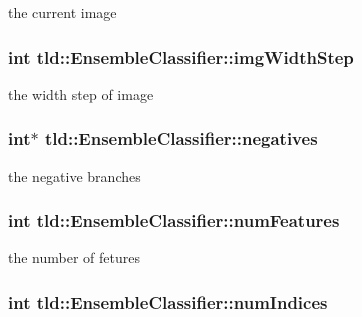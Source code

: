 the current image 

\hypertarget{classtld_1_1EnsembleClassifier_a149e36a3d0d287ee804ec7cf92dc6569}{
\subsubsection[{img\-Width\-Step}]{\setlength{\rightskip}{0pt plus 5cm}int tld\-::\-Ensemble\-Classifier\-::img\-Width\-Step}}\label{classtld_1_1EnsembleClassifier_a149e36a3d0d287ee804ec7cf92dc6569}


the width step of image 

\hypertarget{classtld_1_1EnsembleClassifier_a2de7561eb20a0f0a1b4909d6dfd89d0b}{
\subsubsection[{negatives}]{\setlength{\rightskip}{0pt plus 5cm}int$\ast$ tld\-::\-Ensemble\-Classifier\-::negatives}}\label{classtld_1_1EnsembleClassifier_a2de7561eb20a0f0a1b4909d6dfd89d0b}


the negative branches 

\hypertarget{classtld_1_1EnsembleClassifier_a176aba4e90f0b9373d8aedd7c25fa262}{
\subsubsection[{num\-Features}]{\setlength{\rightskip}{0pt plus 5cm}int tld\-::\-Ensemble\-Classifier\-::num\-Features}}\label{classtld_1_1EnsembleClassifier_a176aba4e90f0b9373d8aedd7c25fa262}


the number of fetures 

\hypertarget{classtld_1_1EnsembleClassifier_afbfbda1b693525895467fba88a8debe3}{
\subsubsection[{num\-Indices}]{\setlength{\rightskip}{0pt plus 5cm}int tld\-::\-Ensemble\-Classifier\-::num\-Indices}}\label{classtld_1_1EnsembleClassifier_afbfbda1b693525895467fba88a8debe3}


